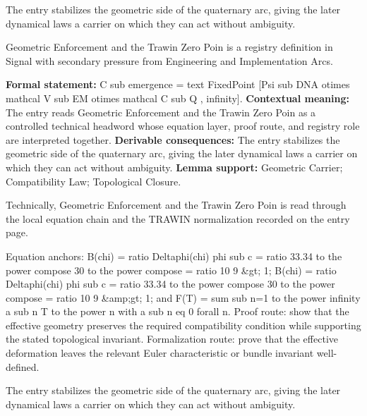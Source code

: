 The entry stabilizes the geometric side of the quaternary arc, giving the later dynamical laws a carrier on which they can act without ambiguity.
\clearpage


\begingroup\small
{}
Geometric Enforcement and the Trawin Zero Poin is a registry definition in Signal with secondary pressure from Engineering and Implementation Arcs.

\begingroup\footnotesize\setlength{\emergencystretch}{3em}\sloppy
\textbf{Formal statement:} C sub emergence = text FixedPoint [Psi sub DNA otimes mathcal V sub EM otimes mathcal C sub Q , infinity]. \textbf{Contextual meaning:} The entry reads Geometric Enforcement and the Trawin Zero Poin as a controlled technical headword whose equation layer, proof route, and registry role are interpreted together. \textbf{Derivable consequences:} The entry stabilizes the geometric side of the quaternary arc, giving the later dynamical laws a carrier on which they can act without ambiguity. \textbf{Lemma support:} Geometric Carrier; Compatibility Law; Topological Closure.\par
\endgroup

Technically, Geometric Enforcement and the Trawin Zero Poin is read through the local equation chain and the TRAWIN normalization recorded on the entry page.

Equation anchors: B(chi) = ratio Deltaphi(chi) phi sub c = ratio 33.34 to the power compose 30 to the power compose = ratio 10 9 \&gt; 1; B(chi) = ratio Deltaphi(chi) phi sub c = ratio 33.34 to the power compose 30 to the power compose = ratio 10 9 \&amp;gt; 1; and F(T) = sum sub n=1 to the power infinity a sub n T to the power n with a sub n eq 0 forall n. Proof route: show that the effective geometry preserves the required compatibility condition while supporting the stated topological invariant. Formalization route: prove that the effective deformation leaves the relevant Euler characteristic or bundle invariant well-defined.

The entry stabilizes the geometric side of the quaternary arc, giving the later dynamical laws a carrier on which they can act without ambiguity.
\endgroup

